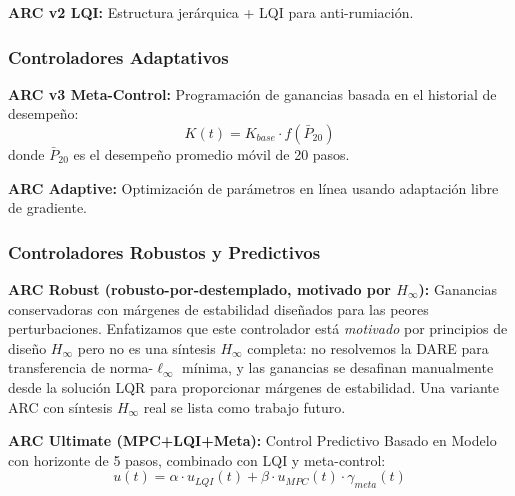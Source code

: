 \documentclass{article}
\begin{document}
\textbf{ARC v2 LQI:} Estructura jerárquica + LQI para anti-rumiación.

\subsubsection{Controladores Adaptativos}

\textbf{ARC v3 Meta-Control:} Programación de ganancias basada en el historial de desempeño:
\begin{equation}
K(t) = K_{base} \cdot f(\bar{P}_{20})
\end{equation}
donde $\bar{P}_{20}$ es el desempeño promedio móvil de 20 pasos.

\textbf{ARC Adaptive:} Optimización de parámetros en línea usando adaptación libre de gradiente.

\subsubsection{Controladores Robustos y Predictivos}

\textbf{ARC Robust (robusto-por-destemplado, motivado por $H_\infty$):} Ganancias conservadoras con márgenes de estabilidad diseñados para las peores perturbaciones. Enfatizamos que este controlador está \emph{motivado} por principios de diseño $H_\infty$ pero no es una síntesis $H_\infty$ completa: no resolvemos la DARE para transferencia de norma-$\ell_\infty$ mínima, y las ganancias se desafinan manualmente desde la solución LQR para proporcionar márgenes de estabilidad. Una variante ARC con síntesis $H_\infty$ real se lista como trabajo futuro.

\textbf{ARC Ultimate (MPC+LQI+Meta):} Control Predictivo Basado en Modelo con horizonte de 5 pasos, combinado con LQI y meta-control:
\begin{equation}
u(t) = \alpha \cdot u_{LQI}(t) + \beta \cdot u_{MPC}(t) \cdot \gamma_{meta}(t)
\end{equation}
\end{document}
